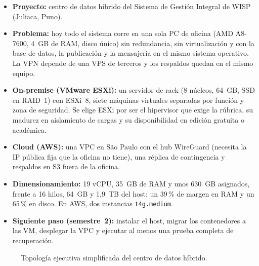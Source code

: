 \begin{itemize}
  \item \textbf{Proyecto:} centro de datos híbrido del Sistema de Gestión Integral de
  WISP (Juliaca, Puno).
  \item \textbf{Problema:} hoy todo el sistema corre en una sola PC de oficina (AMD
  A8-7600, 4~GB de RAM, disco único) sin redundancia, sin virtualización y con la
  base de datos, la publicación y la mensajería en el mismo sistema operativo. La VPN
  depende de una VPS de terceros y los respaldos quedan en el mismo equipo.
  \item \textbf{On-premise (VMware ESXi):} un servidor de rack (8 núcleos, 64~GB, SSD en
  RAID~1) con ESXi~8, siete máquinas virtuales separadas por función y zona de
  seguridad. Se elige ESXi por ser el hipervisor que exige la rúbrica, su madurez en
  aislamiento de cargas y su disponibilidad en edición gratuita o académica.
  \item \textbf{Cloud (AWS):} una VPC en São Paulo con el hub WireGuard (necesita la IP
  pública fija que la oficina no tiene), una réplica de contingencia y respaldos en S3
  fuera de la oficina.
  \item \textbf{Dimensionamiento:} 19 vCPU, 35~GB de RAM y unos 630~GB asignados,
  frente a 16 hilos, 64~GB y 1,9~TB del host: un 39\,\% de margen en RAM y un 65\,\% en
  disco. En AWS, dos instancias \texttt{t4g.medium}.
  \item \textbf{Siguiente paso (semestre~2):} instalar el host, migrar los contenedores
  a las VM, desplegar la VPC y ejecutar al menos una prueba completa de recuperación.
\end{itemize}

\begin{figure}[htbp]
\centering
{}
\caption{Topología ejecutiva simplificada del centro de datos híbrido.}
\label{fig:ce03-dc-ejecutiva}
\end{figure}

